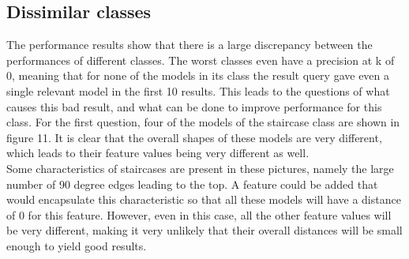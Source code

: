 \documentclass{bigdata}
\begin{document}
\subsection{Dissimilar classes}
The performance results show that there is a large discrepancy between the performances of different classes. The worst classes even have a precision at k of 0, meaning that for none of the models in its class the result query gave even a single relevant model in the first 10 results. This leads to the questions of what causes this bad result, and what can be done to improve performance for this class. For the first question, four of the models of the staircase class are shown in figure 11. It is clear that the overall shapes of these models are very different, which leads to their feature values being very different as well. \\
Some characteristics of staircases are present in these pictures, namely the large number of 90 degree edges leading to the top. A feature could be added that would encapsulate this characteristic so that all these models will have a distance of 0 for this feature. However, even in this case, all the other feature values will be very different, making it very unlikely that their overall distances will be small enough to yield good results.
\end{document}
